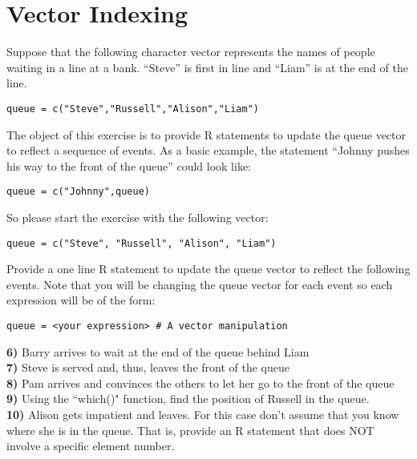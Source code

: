 \documentclass{article}
\begin{document}
\section*{Vector Indexing}
\noindent
Suppose that the following character vector represents the names of people waiting in a line at a bank. ``Steve'' is first in line and ``Liam'' is at the
end of the line.

\begin{verbatim}
queue = c("Steve","Russell","Alison","Liam")
\end{verbatim}

\noindent
The object of this exercise is to provide R statements to update the
queue vector to reflect a sequence of events. As a basic example, the
statement ``Johnny pushes his way to the front of the queue'' could
look like:

\begin{verbatim}
queue = c("Johnny",queue)
\end{verbatim}

\noindent
So please start the exercise with the following vector:

\begin{verbatim}
queue = c("Steve", "Russell", "Alison", "Liam")
\end{verbatim}

\noindent
Provide a one line R statement to update the queue vector to reflect the
following events. Note that you will be changing the queue vector
for each event so each expression will be of the form:

\begin{verbatim}
queue = <your expression> # A vector manipulation
\end{verbatim}

\noindent
{\bf 6)} Barry arrives to wait at the end of the queue behind Liam
\\

\noindent
{\bf 7)} Steve is served and, thus, leaves the front of the queue
\\

\noindent
{\bf 8)} Pam arrives and convinces the others to let her go to the front of
the queue
\\

\noindent
{\bf 9)} Using the ``which()" function, find the position of Russell in the queue.
\\

\noindent
{\bf 10)} Alison gets impatient and leaves. For this case don't assume that you
know where she is in the queue. That is, provide an R statement that does
NOT involve a specific element number.
\end{document}
